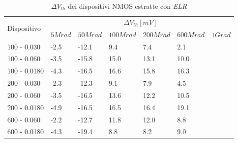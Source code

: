 \documentclass[
	a4paper,
	cleardoublepage=empty,
	headings=twolinechapter,
	numbers=autoenddot,
]{scrbook}
\begin{document}
\begin{table}[H]
  \renewcommand{\arraystretch}{1.3}
  \begin{tabular}{m{2.1cm}  m{1.1cm} m{1.3cm} m{1.5cm} m{1.5cm} m{1.5cm} m{1cm}}
    \toprule
    \multirow{2}{*}{Dispositivo} & \multicolumn{6}{c}{$\Delta V_{th} [mV] $}                                                          \\
    \cmidrule{2-7}
                                 & $5Mrad$                                   & $50Mrad$ & $100Mrad$ & $200Mrad$ & $600Mrad$ & $1Grad$ \\
    \midrule
    100 - 0.030                     & -2.5                                      & -12.1    & 9.4       & 7.4       & 2.1       &         \\
    \hline
    100 - 0.060                     & -3.5                                      & -15.8    & 15.0      & 13.1      & 10.0      &         \\
    \hline
    100 - 0.0180                    & -4.3                                      & -16.5    & 16.6      & 15.8      & 16.3      &         \\
    \hline
    200 - 0.030                     & -2.3                                      & -12.3    & 9.1       & 7.9       & 4.5       &         \\
    \hline
    200 - 0.060                     & -3.5                                      & -16.5    & 13.6      & 12.2      & 10.5      &         \\
    \hline
    200 - 0.0180                    & -4.9                                      & -16.5    & 16.5      & 16.4      & 19.1      &         \\
    \hline
    600 - 0.060                     & -2.2                                      & -12.7    & 11.8      & 12.0      & 8.8       &         \\
    \hline
    600 - 0.0180                    & -4.3                                      & -19.4    & 8.8       & 8.2       & 9.0       &         \\
    \bottomrule
  \end{tabular}
  \caption{$\Delta V_{th}$ dei dispositivi NMOS estratte con \emph{ELR}}
  \label{tab:deltaVthELRN}
\end{table}
\end{document}
